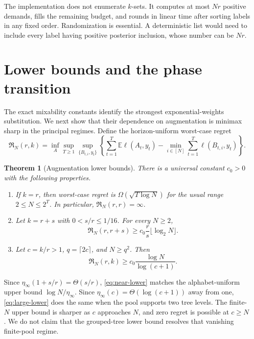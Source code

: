 \documentclass{article}
\newtheorem{theorem}{Theorem}
\theoremstyle{definition}
\theoremstyle{remark}
\newcommand{\E}{\mathbb E}
\newcommand{\1}{\mathbf 1}
\begin{document}
The implementation does not enumerate \(k\)-sets. It computes at most \(Nr\) positive demands, fills the remaining budget, and rounds in linear time after sorting labels in any fixed order. Randomization is essential. A deterministic list would need to include every label having positive posterior inclusion, whose number can be \(Nr\).

\section{Lower bounds and the phase transition}
\label{sec:lower}

The exact mixability constants identify the strongest exponential-weights substitution. We next show that their dependence on augmentation is minimax sharp in the principal regimes. Define the horizon-uniform worst-case regret \[ \mathfrak R_N(r,k) =\inf_A\sup_{T\ge1}\sup_{\{B_{t,i},y_t\}} \left\{ \sum_{t=1}^T\E\ell(A_t,y_t) -\min_{i\in[N]}\sum_{t=1}^T\ell(B_{t,i},y_t) \right\}. \]

\begin{theorem}[Augmentation lower bounds]
\label{thm:lower}
There is a universal constant \(c_0>0\) with the following properties.
\begin{enumerate}
\item If \(k=r\), then worst-case regret is \(\Omega(\sqrt{T\log N})\) for the usual range \(2\le N\le 2^T\). In particular, \(\mathfrak R_N(r,r)=\infty\).
\item Let \(k=r+s\) with \(0<s/r\le1/16\). For every \(N\ge2\),
\begin{equation}
\label{eq:near-lower}
\mathfrak R_N(r,r+s)
\ge c_0\frac r s\lfloor\log_2N\rfloor.
\end{equation}
\item Let \(c=k/r>1\), \(q=\lceil2c\rceil\), and \(N\ge q^2\). Then
\begin{equation}
\label{eq:large-lower}
\mathfrak R_N(r,k)
\ge c_0\frac{\log N}{\log(c+1)}.
\end{equation}
\end{enumerate}
\end{theorem}

Since \(\eta_\infty(1+s/r)=\Theta(s/r)\), \eqref{eq:near-lower} matches the alphabet-uniform upper bound \(\log N/\eta_\infty\). Since \(\eta_\infty(c)=\Theta(\log(c+1))\) away from one, \eqref{eq:large-lower} does the same when the pool supports two tree levels. The finite-\(N\) upper bound is sharper as \(c\) approaches \(N\), and zero regret is possible at \(c\ge N\). We do not claim that the grouped-tree lower bound resolves that vanishing finite-pool regime.
\end{document}
